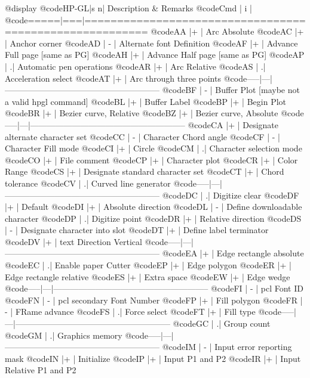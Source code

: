@display
@code{HP-GL|s n| Description & Remarks}
@code{Cmd  | i |}
@code{=====|===|========================================================}
@code{AA   |+  | Arc Absolute}
@code{AC   |+  | Anchor corner}
@code{AD   | - | Alternate font Definition}
@code{AF   |+  | Advance Full page [same as PG]}
@code{AH   |+  | Advance Half page [same as PG]}
@code{AP   |  .| Automatic pen operations}
@code{AR   |+  | Arc Relative}
@code{AS   |  .| Acceleration select}
@code{AT   |+  | Arc through three points}
@code{-----|---|--------------------------------------------------------}
@code{BF   | - | Buffer Plot [maybe not a valid hpgl command]}
@code{BL   |+  | Buffer Label}
@code{BP   |+  | Begin Plot}
@code{BR   |+  | Bezier curve, Relative}
@code{BZ   |+  | Bezier curve, Absolute}
@code{-----|---|--------------------------------------------------------}
@code{CA   |+  | Designate alternate character set}
@code{CC   | - | Character Chord angle}
@code{CF   | - | Character Fill mode}
@code{CI   |+  | Circle}
@code{CM   |  .| Character selection mode}
@code{CO   |+  | File comment}
@code{CP   |+  | Character plot}
@code{CR   |+  | Color Range}
@code{CS   |+  | Designate standard character set}
@code{CT   |+  | Chord tolerance}
@code{CV   |  .| Curved line generator}
@code{-----|---|--------------------------------------------------------}
@code{DC   |  .| Digitize clear}
@code{DF   |+  | Default}
@code{DI   |+  | Absolute direction}
@code{DL   | - | Define downloadable character}
@code{DP   |  .| Digitize point}
@code{DR   |+  | Relative direction}
@code{DS   | - | Designate character into slot}
@code{DT   |+  | Define label terminator}
@code{DV   |+  | text Direction Vertical}
@code{-----|---|--------------------------------------------------------}
@code{EA   |+  | Edge rectangle absolute}
@code{EC   |  .| Enable paper Cutter}
@code{EP   |+  | Edge polygon}
@code{ER   |+  | Edge rectangle relative}
@code{ES   |+  | Extra space}
@code{EW   |+  | Edge wedge}
@code{-----|---|--------------------------------------------------------}
@code{FI   | - | pcl Font ID}
@code{FN   | - | pcl secondary Font Number}
@code{FP   |+  | Fill polygon}
@code{FR   | - | FRame advance}
@code{FS   |  .| Force select}
@code{FT   |+  | Fill type}
@code{-----|---|--------------------------------------------------------}
@code{GC   |  .| Group count}
@code{GM   |  .| Graphics memory}
@code{-----|---|--------------------------------------------------------}
@code{IM   | - | Input error reporting mask}
@code{IN   |+  | Initialize}
@code{IP   |+  | Input P1 and P2}
@code{IR   |+  | Input Relative P1 and P2}
